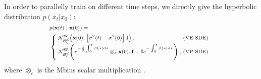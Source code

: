 \documentclass[letterpaper]{article} %
\begin{document}
In order to parallelly train on different time steps, we directly give the hyperbolic distribution $p (x_t | x_0)$:
\begin{equation}\label{10}
\begin{scriptsize}{
\begin{aligned}
    &p(\mathbf{x}(t) \mid \mathbf{x}(0))=\\ &\left\{\hspace{-0.1cm}\begin{array}{ll}
\mathcal{N}_{\mathcal{B}_{c}^{d}}^{\mathrm{W}}\!\left(\mathbf{x}(0),\left[\sigma^{2}(t)-\sigma^{2}(0)\right] \mathbf{I}\right), &\hspace{-0.25cm} \text{(VE SDE)} \\
\mathcal{N}_{\mathcal{B}_{c}^{d}}^{\mathrm{W}}\!\left(e^{-\frac{1}{2} \int_{0}^{t} \beta(s) \mathrm{d} s}\otimes_c \mathbf{x}(0) , \mathbf{I}-\mathbf{I} e^{-\int_{0}^{t} \beta(s) \mathrm{d} s}\right), &\hspace{-0.25cm} (\text{VP SDE)} \\
\end{array}\right.
\end{aligned}
}\end{scriptsize}
\end{equation}
%
where $\otimes_c$ is the Mbius scalar multiplication \cite{ungar2007hyperbolic}.
\end{document}
